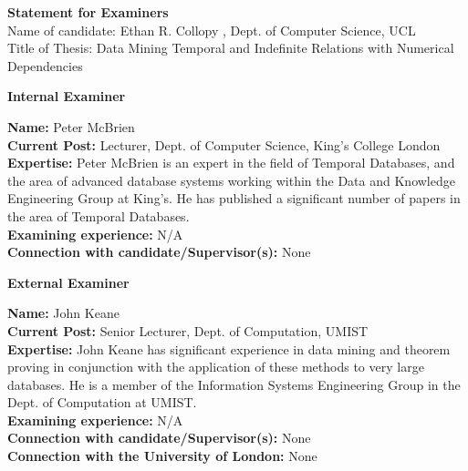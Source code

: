 \documentclass[12pt]{article}
\begin{document}
\noindent
\begin{center} 
{{\bf Statement for Examiners }} \\[4ex]

{Name of candidate:  Ethan R. Collopy , Dept. of Computer Science, UCL} \\[4ex]
 {Title of Thesis: Data Mining Temporal and Indefinite Relations
with Numerical Dependencies } \\[2ex]
       \end{center}
\bigskip

\begin{flushleft}


{\bf Internal Examiner}

\medskip

{\bf Name:} Peter McBrien \\
{\bf Current Post:} Lecturer, Dept. of Computer Science, King's College London\\
{\bf Expertise:} Peter McBrien is an expert in the field of Temporal
Databases, and the area of advanced database systems working within
the Data and Knowledge Engineering Group at King's. He has published a
significant number of papers in the area of Temporal Databases.\\
{\bf Examining experience:} N/A\\
{\bf Connection with candidate/Supervisor(s):} None\\

\bigskip

{\bf External Examiner}

\medskip

{ \bf Name:} John Keane\\
{ \bf Current Post:} Senior Lecturer, Dept. of Computation, UMIST\\
{ \bf Expertise:} John Keane has significant experience in data mining and
theorem proving in conjunction with the application of these methods
to very large databases. He is a member of the Information Systems
Engineering Group in the Dept. of Computation at UMIST.\\
{ \bf Examining experience:} N/A\\
{ \bf Connection with candidate/Supervisor(s):} None\\
{ \bf Connection with the University of London:} None \\


\end{flushleft}
\end{document}

